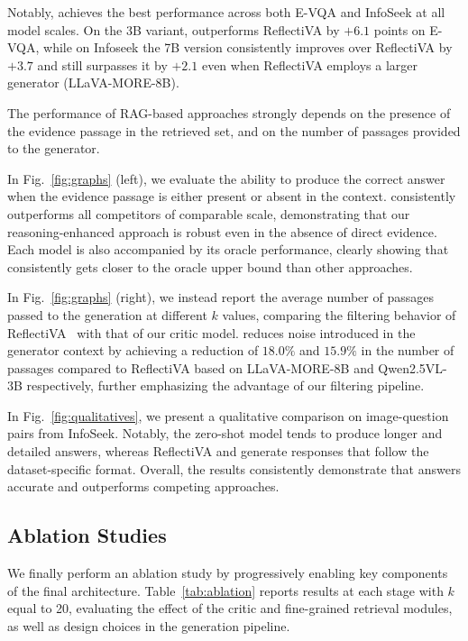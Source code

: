 Notably, \ours achieves the best performance across both E-VQA and InfoSeek at all model scales. On the 3B variant, \ours outperforms ReflectiVA by $+6.1$ points on E-VQA, while on Infoseek the 7B version consistently improves over ReflectiVA by $+3.7$ and still surpasses it by $+2.1$ even when ReflectiVA employs a larger generator (LLaVA-MORE-8B).

The performance of RAG-based approaches strongly depends on the presence of the evidence passage in the retrieved set, and on the number of passages provided to the generator. 

In Fig.~\ref{fig:graphs} (left), we evaluate the ability to produce the correct answer when the evidence passage is either present or absent in the context. \ours consistently outperforms all competitors of comparable scale, demonstrating that our reasoning-enhanced approach is robust even in the absence of direct evidence. Each model is also accompanied by its oracle performance, clearly showing that \ours consistently gets closer to the oracle upper bound than other approaches.

In Fig.~\ref{fig:graphs} (right), we instead report the average number of passages passed to the generation at different $k$ values, comparing the filtering behavior of ReflectiVA~\cite{cocchi2025augmenting} with that of our critic model. \ours reduces noise introduced in the generator context by achieving a reduction of $18.0\%$ and $15.9\%$ in the number of passages compared to ReflectiVA based on LLaVA-MORE-8B and Qwen2.5VL-3B respectively, further emphasizing the advantage of our filtering pipeline.

In Fig.~\ref{fig:qualitatives}, we present a qualitative comparison on image-question pairs from InfoSeek. Notably, the zero-shot model tends to produce longer and detailed answers, whereas ReflectiVA and \ours generate responses that follow the dataset-specific format. Overall, the results consistently demonstrate that \ours answers accurate and outperforms competing approaches.


\subsection{Ablation Studies} 
We finally perform an ablation study by progressively enabling key components of the final architecture. Table~\ref{tab:ablation} reports results at each stage with $k$ equal to 20, evaluating the effect of the critic and fine-grained retrieval modules, as well as design choices in the generation pipeline.

